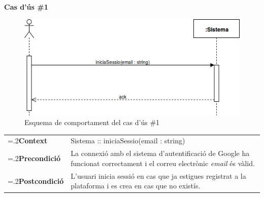 \noindent\textbf{\large Cas d'ús \#1}\\
\begin{figure}[H]
\centering
\includegraphics[scale=0.6]{Figures/casdus_01.png}
\caption{Esquema de comportament del cas d'ús \#1}
\end{figure}
\begin{table}[h]
\noindent
\begin{tabularx}{\linewidth}{
>{\hsize=.2\hsize}X%
>{\hsize=0.8\hsize}X%
}
\textbf{Context} 		& Sistema :: iniciaSessio(email : string) \\
\textbf{Precondició} 	& La connexió amb el sistema d'autentificació de Google ha funcionat correctament i el correu electrònic \textit{email} és vàlid.\\
\textbf{Postcondició}	& L'usuari inicia sessió en cas que ja estigues registrat a la plataforma i es crea en cas que no existís. \\
\end{tabularx}
\label{}
\end{table}

